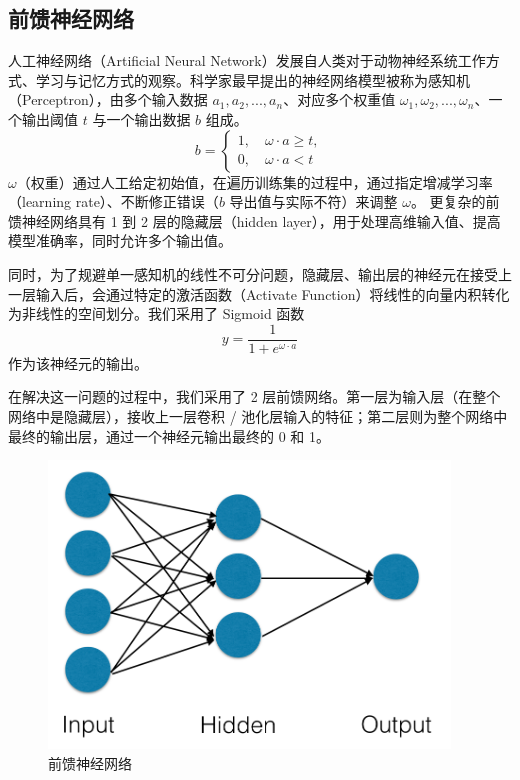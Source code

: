 \documentclass[UTF8]{ctexart}
\begin{document}
\subsection{前馈神经网络}
人工神经网络（Artificial Neural Network）发展自人类对于动物神经系统工作方式、学习与记忆方式的观察。科学家最早提出的神经网络模型被称为感知机（Perceptron），由多个输入数据 $a_1, a_2, ..., a_n$、对应多个权重值 $\omega_1, \omega_2, ..., \omega_n$、一个输出阈值 $t$ 与一个输出数据 $b$ 组成。
$$
b = 
\left\{
\begin{aligned}
1, \quad \omega \cdot a \geqslant t,\\
0, \quad \omega \cdot a < t
\end{aligned}
\right.
$$
$\omega$（权重）通过人工给定初始值，在遍历训练集的过程中，通过指定增减学习率（learning rate）、不断修正错误（$b$ 导出值与实际不符）来调整 $\omega$。
更复杂的前馈神经网络具有 1 到 2 层的隐藏层（hidden layer），用于处理高维输入值、提高模型准确率，同时允许多个输出值。

同时，为了规避单一感知机的线性不可分问题，隐藏层、输出层的神经元在接受上一层输入后，会通过特定的激活函数（Activate Function）将线性的向量内积转化为非线性的空间划分。我们采用了 Sigmoid 函数
$$y = \frac{1}{1 + e^{\omega \cdot a}}$$
作为该神经元的输出。

在解决这一问题的过程中，我们采用了 2 层前馈网络。第一层为输入层（在整个网络中是隐藏层），接收上一层卷积 / 池化层输入的特征；第二层则为整个网络中最终的输出层，通过一个神经元输出最终的 0 和 1。

\begin{figure}[htbp]
  \centering
  \includegraphics[width=0.95\textwidth]{../reference/feed-forward.png}
  \caption{前馈神经网络}
  \label{fig:shapes1}
\end{figure}
\end{document}
